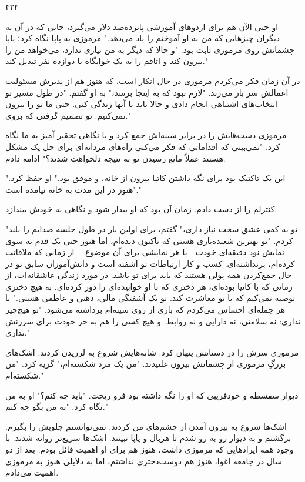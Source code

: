 ۴۲۴

او حتی الآن هم برای اردوهای آموزشی پانزده‌صد دلار می‌گیرد، جایی که در آن به دیگران چیزهایی که من به او آموختم را یاد می‌دهد." مرموزی به پاپا نگاه کرد؛ پاپا چشمانش روی مرموزی ثابت بود. "و حالا که دیگر به من نیازی ندارد، می‌خواهد من را بیرون کند و اتاقم را به یک خوابگاه با دوازده نفر تبدیل کند." 

در آن زمان فکر می‌کردم مرموزی در حال انکار است، که هنوز هم از پذیرش مسئولیت اعمالش سر باز می‌زند. "لازم نبود که به اینجا برسد،" به او گفتم. "در طول مسیر تو انتخاب‌های اشتباهی انجام دادی و حالا باید با آنها زندگی کنی. حتی ما تو را بیرون نمی‌کنیم. تو تصمیم گرفتی که بروی." 

مرموزی دست‌هایش را در برابر سینه‌اش جمع کرد و با نگاهی تحقیر آمیز به ما نگاه کرد. "نمی‌بینی که اقداماتی که فکر می‌کنی راه‌های مردانه‌ای برای حل یک مشکل هستند عملاً مانع رسیدن تو به نتیجه دلخواهت شدند؟" ادامه دادم. 

"این یک تاکتیک بود برای نگه داشتن کاتیا بیرون از خانه، و موفق بود." او حفظ کرد. "هنوز در این مدت به خانه نیامده است." 

کنترلم را از دست دادم. زمان آن بود که او بیدار شود و نگاهی به خودش بیندازد. 

"تو به کمی عشق سخت نیاز داری،" گفتم، برای اولین بار در طول جلسه صدایم را بلند کردم. "تو بهترین شعبده‌بازی هستی که تاکنون دیده‌ام، اما هنوز حتی یک قدم به سوی نمایش نود دقیقه‌ای خودت—یا هر نمایشی برای آن موضوع— از زمانی که ملاقاتت کرده‌ام، برنداشته‌ای. کسب و کار ارتباطات تو آشفته است و دانش‌آموزان سابق تو در حال جمع‌کردن همه پولی هستند که باید برای تو باشد. در مورد زندگی عاشقانه‌ات، از زمانی که با کاتیا بوده‌ای، هر دختری که با او خوابیده‌ای را دور کرده‌ای. به هیچ دختری توصیه نمی‌کنم که با تو معاشرت کند. تو یک آشفتگی مالی، ذهنی و عاطفی هستی." با هر جمله‌ای احساس می‌کردم که باری از روی سینه‌ام برداشته می‌شود. "تو هیچ‌چیز نداری: نه سلامتی، نه دارایی و نه روابط. و هیچ کسی را هم به جز خودت برای سرزنش نداری." 

مرموزی سرش را در دستانش پنهان کرد. شانه‌هایش شروع به لرزیدن کردند. اشک‌های بزرگِ مرموزی از چشمانش بیرون غلتیدند. "من یک مرد شکسته‌ام،" گریه کرد. "من شکسته‌ام." 

دیوار سفسطه و خودفریبی که او را نگه داشته بود فرو ریخت. "باید چه کنم؟" او به من نگاه کرد. "به من بگو چه کنم." 

اشک‌ها شروع به بیرون آمدن از چشم‌های من کردند. نمی‌توانستم جلویش را بگیرم. برگشتم و به دیوار رو به رو شدم تا هربال و پاپا نبینند. اشک‌ها سریع‌تر روانه شدند. با وجود همه ایرادهایی که مرموزی داشت، هنوز هم برای او اهمیت قائل بودم. بعد از دو سال در جامعه اغوا، هنوز هم دوست‌دختری نداشتم، اما به دلایلی هنوز به مرموزی اهمیت می‌دادم.
